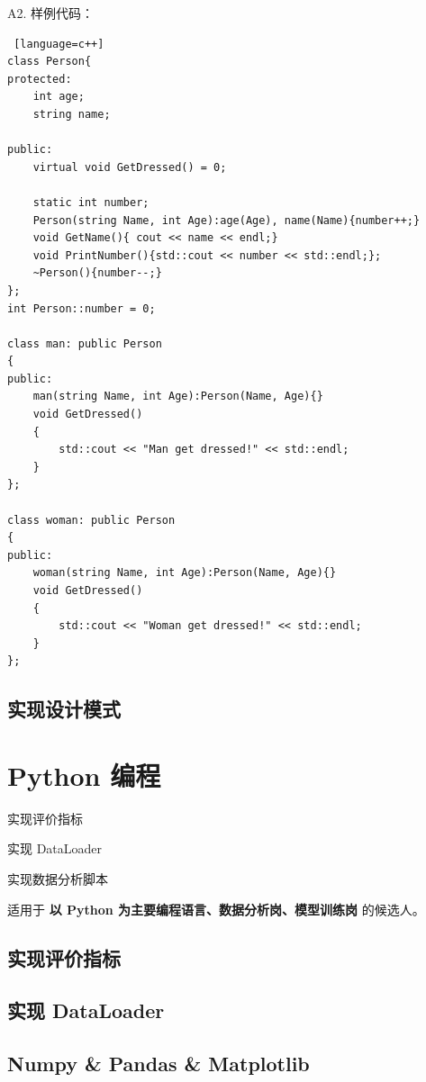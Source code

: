 \documentclass[cn,10pt,math=newtx,citestyle=gb7714-2015,bibstyle=gb7714-2015]{elegantbook}
\begin{document}
A2. 样例代码：

\begin{lstlisting} [language=c++]
class Person{
protected:  
    int age;
    string name;

public:
    virtual void GetDressed() = 0;

    static int number;
    Person(string Name, int Age):age(Age), name(Name){number++;}
    void GetName(){ cout << name << endl;}
    void PrintNumber(){std::cout << number << std::endl;};
    ~Person(){number--;}
};
int Person::number = 0;

class man: public Person
{
public:
    man(string Name, int Age):Person(Name, Age){}
    void GetDressed()
    {
        std::cout << "Man get dressed!" << std::endl;
    }
};

class woman: public Person
{
public:
    woman(string Name, int Age):Person(Name, Age){}
    void GetDressed()
    {
        std::cout << "Woman get dressed!" << std::endl;
    }
};
\end{lstlisting}

\subsection{实现设计模式}

\newpage


\section{Python 编程}

\begin{introduction}
\item 实现评价指标
\item 实现 DataLoader
\item 实现数据分析脚本
\end{introduction}

适用于 \textbf{以 Python 为主要编程语言、数据分析岗、模型训练岗} 的候选人。

\subsection{实现评价指标}

\subsection{实现 DataLoader}

\subsection{Numpy \& Pandas \& Matplotlib}
\end{document}
